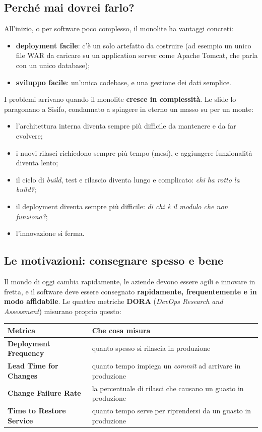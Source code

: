 \subsection{Perché mai dovrei farlo?}

All'inizio, o per software poco complesso, il monolite ha vantaggi concreti:
\begin{itemize}
  \item \textbf{deployment facile}: c'è un solo artefatto da costruire (ad esempio un unico file WAR da caricare su un
        application server come Apache Tomcat, che parla con un unico database);
  \item \textbf{sviluppo facile}: un'unica codebase, e una gestione dei dati semplice.
\end{itemize}

I problemi arrivano quando il monolite \textbf{cresce in complessità}. Le slide lo paragonano a Sisifo, condannato a
spingere in eterno un masso su per un monte:
\begin{itemize}
  \item l'architettura interna diventa sempre più difficile da mantenere e da far evolvere;
  \item i nuovi rilasci richiedono sempre più tempo (mesi), e aggiungere funzionalità diventa lento;
  \item il ciclo di \textit{build}, test e rilascio diventa lungo e complicato: \textit{chi ha rotto la build?};
  \item il deployment diventa sempre più difficile: \textit{di chi è il modulo che non funziona?};
  \item l'innovazione si ferma.
\end{itemize}

\subsection{Le motivazioni: consegnare spesso e bene}

Il mondo di oggi cambia rapidamente, le aziende devono essere agili e innovare in fretta, e il software deve essere
consegnato \textbf{rapidamente, frequentemente e in modo affidabile}. Le quattro metriche \textbf{DORA}
(\textit{DevOps Research and Assessment}) misurano proprio questo:

\begin{center}
\renewcommand{\arraystretch}{1.35}
\begin{tabular}{@{}>{\bfseries}l >{\raggedright\arraybackslash}p{9.6cm}@{}}
  \toprule
  \normalfont\textbf{Metrica} & \textbf{Che cosa misura} \\
  \midrule
  Deployment Frequency     & quanto spesso si rilascia in produzione \\
  Lead Time for Changes    & quanto tempo impiega un \textit{commit} ad arrivare in produzione \\
  Change Failure Rate      & la percentuale di rilasci che causano un guasto in produzione \\
  Time to Restore Service  & quanto tempo serve per riprendersi da un guasto in produzione \\
  \bottomrule
\end{tabular}
\end{center}

